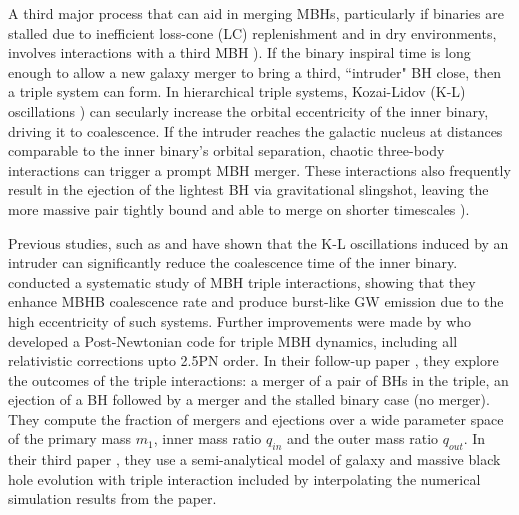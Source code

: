 \documentclass{book}
\begin{document}
A third major process that can aid in merging MBHs, particularly if binaries are stalled due to inefficient loss-cone (LC) replenishment and in dry environments, involves interactions with a third MBH \citep{ryu_interactions_2017,bonetti_post-newtonian_2016,bonetti_post-newtonian_2018-1}). If the binary inspiral time is long enough to allow a new galaxy merger to bring a third, ``intruder" BH close, then a triple system can form. In hierarchical triple systems, Kozai-Lidov (K-L) oscillations \citep{Kozai1962,lidov_evolution_1962,Naoz_2016}) can secularly increase the orbital eccentricity of the inner binary, driving it to coalescence. If the intruder reaches the galactic nucleus at distances comparable to the inner binary’s orbital separation, chaotic three-body interactions can trigger a prompt MBH merger. These interactions also frequently result in the ejection of the lightest BH via gravitational slingshot, leaving the more massive pair tightly bound and able to merge on shorter timescales \citep{saslaw_gravitational_1974,hills_encounters_1975,blaes_kozai_2002,iwasawa_evolution_2006,hoffman_dynamics_2007}).

Previous studies, such as \citet{blaes_kozai_2002} and \citet{iwasawa_evolution_2006,Iwasawa2008} have shown that the K-L oscillations induced by an intruder can significantly reduce the coalescence time of the inner binary. \citet{hoffman_dynamics_2007} conducted a systematic study of MBH triple interactions, showing that they enhance MBHB coalescence rate and produce burst-like GW emission due to the high eccentricity of such systems. Further improvements were made by \citet{bonetti_post-newtonian_2016,bonetti_post-newtonian_2018-1} who developed a Post-Newtonian code for triple MBH dynamics, including all relativistic corrections upto 2.5PN order.  In their follow-up paper \cite{bonetti_post-newtonian_2018-1} , they explore the outcomes of the triple interactions: a merger of a pair of BHs in the triple, an ejection of a BH followed by a merger and the stalled binary case (no merger). They compute the fraction of mergers and ejections over a wide parameter space of the primary mass $m_1$, inner mass ratio $q_{in}$ and the outer mass ratio $q_{out}$. In their third paper \cite{bonetti_post-newtonian_2018}, they use a semi-analytical model of galaxy and massive black hole evolution with triple interaction included by interpolating the numerical simulation results from the \citet{bonetti_post-newtonian_2018-1} paper. 
\end{document}
